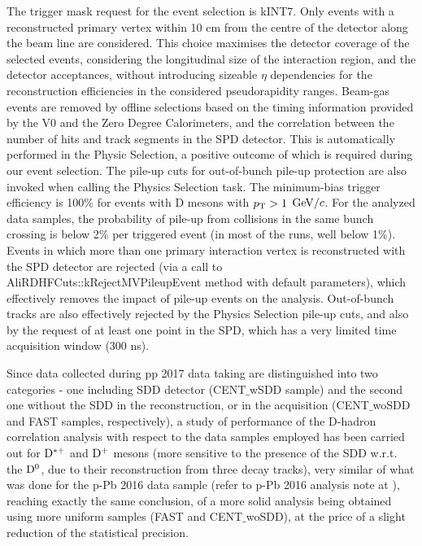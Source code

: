 The trigger mask request for the event selection is kINT7. Only events with a reconstructed primary vertex within 10 cm from the centre of the detector along the beam line are considered. This choice maximises the detector coverage of the selected events, considering the longitudinal size of the interaction region, and the detector acceptances, without introducing sizeable $\eta$ dependencies for the reconstruction efficiencies in the considered pseudorapidity ranges.
Beam-gas events are removed by offline selections based on the timing information provided by the V0 and the Zero Degree Calorimeters, and the correlation between the number of hits and track segments in the SPD detector. This is automatically performed in the Physic Selection, a positive outcome of which is required during our event selection. The pile-up cuts for out-of-bunch pile-up protection are also invoked when calling the Physics Selection task.
The minimum-bias trigger efficiency is 100\% for events with D mesons with $p_{\rm T} > 1$ $\mathrm{GeV}/c$. For the analyzed data samples, the probability of pile-up from collisions in the same bunch crossing is below 2\% per triggered event (in most of the runs, well below 1\%). Events in which more than one primary interaction vertex is reconstructed with the SPD detector are rejected (via a call to AliRDHFCuts::kRejectMVPileupEvent method with default parameters), which effectively removes the impact of pile-up events on the analysis. Out-of-bunch tracks are also effectively rejected by the Physics Selection pile-up cuts, and also by the request of at least one point in the SPD, which has a very limited time acquisition window (300 ns).

Since data collected during pp 2017 data taking are distinguished into two categories - one including SDD detector (CENT$\_$wSDD sample) and the second one without the SDD in the reconstruction, or in the acquisition (CENT$\_$woSDD and FAST samples, respectively), a study of performance of the D-hadron correlation analysis with respect to the data samples employed has been carried out for ${\rm D^{*+}}$ and ${\rm D^+}$ mesons (more sensitive to the presence of the SDD w.r.t. the ${\rm D^0}$, due to their reconstruction from three decay tracks), very similar of what was done for the p-Pb 2016 data sample (refer to p-Pb 2016 analysis note at \cite{NotepPb}), reaching exactly the same conclusion, of a more solid analysis being obtained using more uniform samples (FAST and CENT$\_$woSDD), at the price of a slight reduction of the statistical precision.


